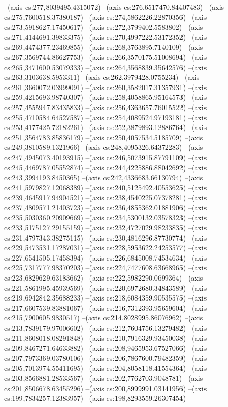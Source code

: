 --(axis cs:277,8039495.4315072)
--(axis cs:276,6517470.84407483)
--(axis cs:275,7600518.37380187)
--(axis cs:274,5862226.22870356)
--(axis cs:273,5918627.17450617)
--(axis cs:272,3799402.5583802)
--(axis cs:271,4144691.39833375)
--(axis cs:270,4997222.53172352)
--(axis cs:269,4474377.23469855)
--(axis cs:268,3763895.7140109)
--(axis cs:267,3569744.86627753)
--(axis cs:266,3570175.51008694)
--(axis cs:265,3471600.53079333)
--(axis cs:264,3568839.35642576)
--(axis cs:263,3103638.5953311)
--(axis cs:262,3979428.0755234)
--(axis cs:261,3660072.03999091)
--(axis cs:260,3582017.31357931)
--(axis cs:259,4215693.98740307)
--(axis cs:258,4058865.95164573)
--(axis cs:257,4555947.83435833)
--(axis cs:256,4363657.76015522)
--(axis cs:255,4710584.64527587)
--(axis cs:254,4089524.97193181)
--(axis cs:253,4177425.72182261)
--(axis cs:252,3879893.12886764)
--(axis cs:251,3564783.85836179)
--(axis cs:250,4057534.5185709)
--(axis cs:249,3810589.1321966)
--(axis cs:248,4095326.64372283)
--(axis cs:247,4945073.40193915)
--(axis cs:246,5073915.87791109)
--(axis cs:245,4469787.05552874)
--(axis cs:244,4225886.88042692)
--(axis cs:243,3994193.8450365)
--(axis cs:242,4336683.66130794)
--(axis cs:241,5979827.12068389)
--(axis cs:240,5125492.40553625)
--(axis cs:239,4645917.94904521)
--(axis cs:238,4540225.07378281)
--(axis cs:237,4809571.21403723)
--(axis cs:236,4855362.01881906)
--(axis cs:235,5030360.20909669)
--(axis cs:234,5300132.03578323)
--(axis cs:233,5175127.29155159)
--(axis cs:232,4727029.98233835)
--(axis cs:231,4797343.38275115)
--(axis cs:230,4816296.87730774)
--(axis cs:229,5473531.17287031)
--(axis cs:228,5953622.24253577)
--(axis cs:227,6541505.17458394)
--(axis cs:226,6845008.74534634)
--(axis cs:225,7317777.98370203)
--(axis cs:224,7477608.63668965)
--(axis cs:223,6829629.63183662)
--(axis cs:222,5982290.0699364)
--(axis cs:221,5861995.45939569)
--(axis cs:220,6972680.34843589)
--(axis cs:219,6942842.35688233)
--(axis cs:218,6084359.90535575)
--(axis cs:217,6607539.83881067)
--(axis cs:216,7312393.95659604)
--(axis cs:215,7900605.9830517)
--(axis cs:214,8028995.86076962)
--(axis cs:213,7839179.97006602)
--(axis cs:212,7604756.13279482)
--(axis cs:211,8608018.08291848)
--(axis cs:210,7916329.93450038)
--(axis cs:209,8467271.64633882)
--(axis cs:208,9465953.67527066)
--(axis cs:207,7973369.03780106)
--(axis cs:206,7867600.79482359)
--(axis cs:205,7013974.55411695)
--(axis cs:204,8058118.41554364)
--(axis cs:203,8566881.28533567)
--(axis cs:202,7762703.9048781)
--(axis cs:201,8506678.63455296)
--(axis cs:200,8999991.03141956)
--(axis cs:199,7834257.12383957)
--(axis cs:198,8293559.26307454)
